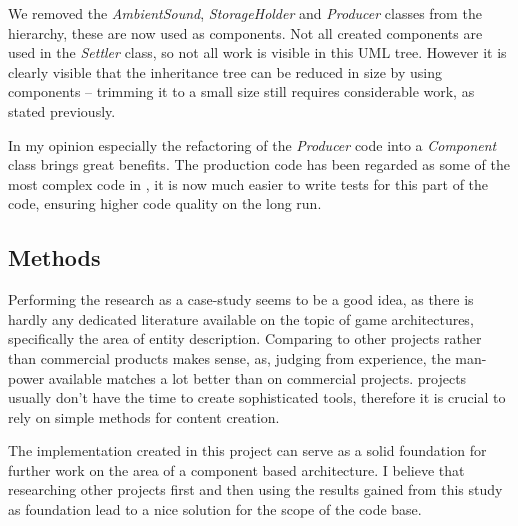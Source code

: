 We removed the \textit{AmbientSound}, \textit{StorageHolder} and \textit{Producer} classes from the hierarchy, these are now used as components.
Not all created components are used in the \textit{Settler} class, so not all work is visible in this UML tree. However
it is clearly visible that the inheritance tree can be reduced in size by using components -- trimming it to a
small size still requires considerable work, as stated previously.

In my opinion especially the refactoring of the \textit{Producer} code into a \textit{Component} class brings great
benefits. The production code has been regarded as some of the most complex code in \UH{}, it is now much easier to
write tests for this part of the code, ensuring higher code quality on the long run.

\subsection{Methods}
Performing the research as a case-study seems to be a good idea, as there is hardly any dedicated literature available on
the topic of game architectures, specifically the area of entity description. Comparing \UH{} to other \OS{} projects
rather than commercial products makes sense, as, judging from experience, the man-power available matches a lot better than on commercial
projects. \OS{} projects usually don't have the time to create sophisticated tools, therefore it is crucial to rely on
simple methods for content creation.

The implementation created in this project can serve as a solid foundation for further work on the area of a component
based architecture. I believe that researching other projects first and then using the results gained from this study as
foundation lead to a nice solution for the scope of the \UH{} code base.
